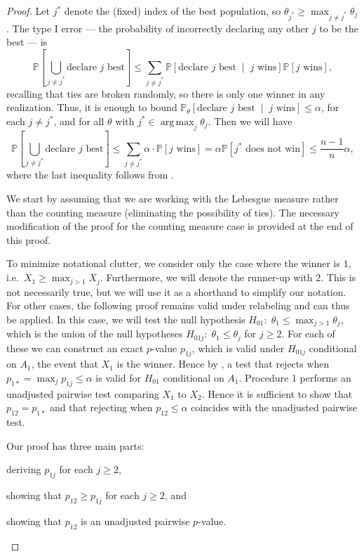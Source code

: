 \documentclass[11pt]{article}
\theoremstyle{definition}
\theoremstyle{custom}
\newcommand{\PP}{\mathbb{P}}
\DeclareMathOperator*{\argmax}{arg\,max}
\begin{document}
\begin{proof}
Let $j^*$ denote the (fixed) index of the best population, so $\theta_{j^*} \ge \max_{j\neq j^*} \theta_j$. The type I error --- the probability of incorrectly declaring any other $j$ to be the best --- is
\[\PP\left[\bigcup_{j \ne j^*} \text{declare } j \text{ best}\right] \le \sum_{j \ne j^*} \PP\left[\text{declare } j \text{ best} \;\middle|\; j \text{ wins}\right] \PP\left[j \text{ wins}\right],\]
recalling that ties are broken randomly, so there is only one winner in any realization. Thus, it is enough to bound $\PP_{\theta}\left[\text{declare } j \text{ best} \;\middle|\; j \text{ wins}\right] \le \alpha$, for each $j \ne j^*$, and for all $\theta$ with $j^* \in \argmax_j \theta_j$. Then we will have
\begin{equation}
\PP\left[\bigcup_{j \ne j^*} \text{declare } j \text{ best}\right] \le \sum_{j \ne j^*} \alpha \cdot \PP\left[j \text{ wins}\right] = \alpha \PP\left[j^* \text{ does not win}\right] \le \frac{n-1}{n} \alpha,
\label{eq:marginal}
\end{equation}
where the last inequality follows from .

We start by assuming that we are working with the Lebesgue measure rather than the counting measure (eliminating the possibility of ties). The necessary modification of the proof for the counting measure case is provided at the end of this proof.

To minimize notational clutter, we consider only the case where the winner is $1$, i.e.\ $X_1 \ge \max_{j > 1} X_j$. Furthermore, we will denote the runner-up with $2$. This is not necessarily true, but we will use it as a shorthand to simplify our notation. For other cases, the following proof remains valid under relabeling and can thus be applied. In this case, we will test the null hypothesis $H_{01}:\; \theta_1 \le \max_{j > 1} \theta_j$, which is the union of the null hypotheses $H_{01j}:\; \theta_1 \le \theta_j$ for $j \ge 2$. For each of these we can construct an exact $p$-value $p_{1j}$, which is valid under $H_{01j}$ conditional on $A_1$, the event that $X_1$ is the winner. Hence by , a test that rejects when $p_{1*} = \max_j p_{1j} \le \alpha$ is valid for $H_{01}$ conditional on $A_1$. Procedure 1 performs an unadjusted pairwise test comparing $X_1$ to $X_2$. Hence it is sufficient to show that $p_{12} = p_{1*}$ and that rejecting when $p_{12}\le \alpha$ coincides with the unadjusted pairwise test.

Our proof has three main parts:
\begin{inlinelist}
\item deriving $p_{1j}$ for each $j\ge 2$,
\item showing that $p_{12} \ge p_{1j}$ for each $j\ge 2$, and
\item showing that $p_{12}$ is an unadjusted pairwise $p$-value.
\end{inlinelist}


\end{proof}
\end{document}

